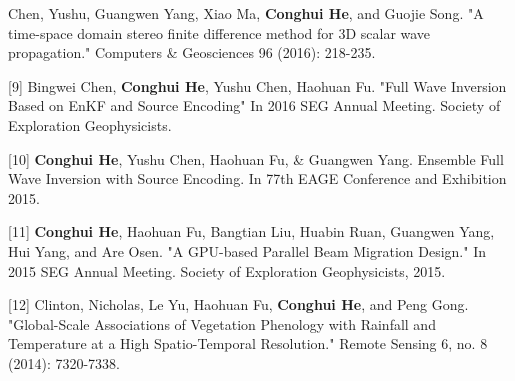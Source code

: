\documentclass[11pt, a4paper]{awesome-cv}
\begin{document}
\begin{cvparagraph}
[8] \hspace{0.5mm} Chen, Yushu, Guangwen Yang, Xiao Ma, \textbf{Conghui He}, and Guojie Song. "A time-space domain stereo finite difference method for 3D scalar wave propagation." Computers \& Geosciences 96 (2016): 218-235.

[9] \hspace{0.5mm} Bingwei Chen, \textbf{Conghui He}, Yushu Chen, Haohuan Fu. "Full Wave Inversion Based on EnKF and Source Encoding" In 2016 SEG Annual Meeting. Society of Exploration Geophysicists.

[10] \hspace{0.5mm} \textbf{Conghui He}, Yushu Chen, Haohuan Fu, \& Guangwen Yang. Ensemble Full Wave Inversion with Source Encoding. In 77th EAGE Conference and Exhibition 2015.

[11] \hspace{0.5mm} \textbf{Conghui He}, Haohuan Fu, Bangtian Liu, Huabin Ruan, Guangwen Yang, Hui Yang, and Are Osen. "A GPU-based Parallel Beam Migration Design." In 2015 SEG Annual Meeting. Society of Exploration Geophysicists, 2015.

[12] \hspace{0.5mm} Clinton, Nicholas, Le Yu, Haohuan Fu, \textbf{Conghui He}, and Peng Gong. "Global-Scale Associations of Vegetation Phenology with Rainfall and Temperature at a High Spatio-Temporal Resolution." Remote Sensing 6, no. 8 (2014): 7320-7338.
\end{cvparagraph}


\end{document}
